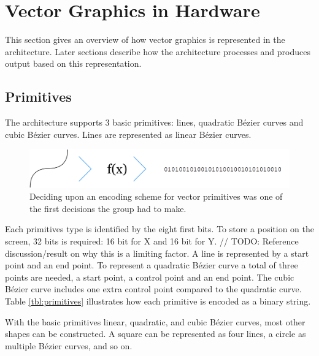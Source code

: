 \section{Vector Graphics in Hardware}

This section gives an overview of how vector graphics is represented in the \vthreek architecture.
Later sections describe how the architecture processes and produces output based on this representation.

\subsection{Primitives}

The \vthreek architecture supports 3 basic primitives: lines, quadratic Bézier curves and cubic Bézier curves.
Lines are represented as linear Bézier curves.

\begin{figure}[h!]
    \centering
    \includegraphics[width=0.8\linewidth]{images/primitive_encoding.png}
    \caption{Deciding upon an encoding scheme for vector primitives was one of the first decisions the group had to make.}
    \label{fig:primitive_encoding}
\end{figure}

Each primitives type is identified by the eight first bits.
To store a position on the screen, 32 bits is required: 16 bit for X and 16 bit for Y. // TODO: Reference discussion/result on why this is a limiting factor.
A line is represented by a start point and an end point.
To represent a quadratic Bézier curve a total of three points are needed, a start point, a control point and an end point.
The cubic Bézier curve includes one extra control point compared to the quadratic curve.
Table \ref{tbl:primitives} illustrates how each primitive is encoded as a binary string.

With the basic primitives linear, quadratic, and cubic Bézier curves, most other shapes can be constructed.
A square can be represented as four lines, a circle as multiple Bézier curves, and so on.

